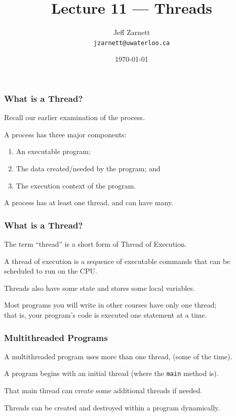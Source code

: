 

\title{Lecture 11 --- Threads}

\author{Jeff Zarnett \\ \small \texttt{jzarnett@uwaterloo.ca}}
\date{\today}




\begin{frame}
	\titlepage

\end{frame}

\begin{frame}
	\frametitle{What is a Thread?}


	Recall our earlier examination of the process.

	A process has three major components:
	\begin{enumerate}
		\item An executable program;
		\item The data created/needed by the program; and
		\item The execution context of the program.
	\end{enumerate}

	A process has at least one \alert{thread}, and can have many.

\end{frame}

\begin{frame}
	\frametitle{What is a Thread?}

	The term ``thread'' is a short form of \alert{Thread of Execution}.

	A thread of execution is a sequence of executable commands that can be scheduled to run on the CPU.

	Threads also have some state and stores some local variables.

	Most programs you will write in other courses have only one thread;\\
	\quad that is, your program's code is executed one statement at a time.

\end{frame}

\begin{frame}
	\frametitle{Multithreaded Programs}

	A multithreaded program uses more than one thread, (some of the time).

	A program begins with an initial thread (where the \texttt{main} method is).

	That main thread can create some additional threads if needed.

	Threads can be created and destroyed within a program dynamically.

\end{frame}

